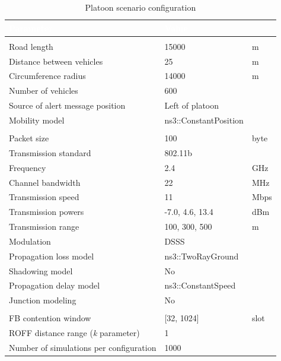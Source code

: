 		\begin{table}[H]
			\def\arraystretch{1.1}
			\begin{tabularx}{\textwidth}{l | l  l}
				\rowcolor{I} {\large \textcolor{white}{Parameter}} & {\large \textcolor{white}{Value}} & {\large \textcolor{white}{}} \TBstrut  \\
				\toprule
				\endhead
				\rowcolor{P} \multicolumn{3}{c}{Scenario configuration} \\
				\midrule[1pt]
				Road length 							& 15000 				& m		\\
				Distance between vehicles 				& 25					& m		\\
				Circumference	radius					& 14000					& m		\\
				Number of vehicles						& 600					& 		\\
				Source of alert message position		& Left of platoon		&		\\
				Mobility model							& ns3::ConstantPosition	&		\\
				\midrule[1pt]
				\rowcolor{P} \multicolumn{3}{c}{Network configuration} \\
				\midrule[1pt]
				Packet size								& 100					& byte	\\	
				Transmission standard					& 802.11b				&		\\
				Frequency								& 2.4					& GHz	\\
				Channel bandwidth						& 22					& MHz	\\
				Transmission speed						& 11					& Mbps	\\
				Transmission powers						& -7.0, 4.6, 13.4		& dBm	\\
				Transmission range						& 100, 300, 500			& m		\\
				Modulation								& DSSS					& 		\\
				Propagation loss model					& ns3::TwoRayGround 	&		\\
				Shadowing model							& No					&		\\
				Propagation delay model					& ns3::ConstantSpeed	&		\\
				Junction modeling						& No					&		\\
				\midrule[1pt]
				\rowcolor{P} \multicolumn{3}{c}{Protocols configuration} \\
				\midrule[1pt]
				FB contention window					& [32, 1024]			& slot	\\
				ROFF distance range (\textit{k} parameter) & 1					&		\\	
				\midrule[1pt]
				Number of simulations per configuration	& 1000					&		\\
				\bottomrule
			\end{tabularx}
			\label{table:platoon}
			\caption{Platoon scenario configuration}
		\end{table}
	
